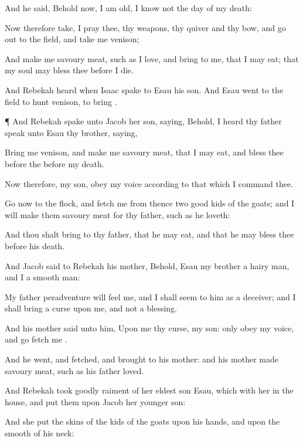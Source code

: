 {And he
said, Behold now, I am
old, I
know not the
day of my
death:

Now therefore
take, I pray thee, thy
weapons, thy
quiver and thy
bow, and go
out to the
field, and
take me
{}
venison;

And
make me savoury
meat, such
as I
love, and
bring
{} to me, that I may
eat; that my
soul may
bless thee
before I
die.

And
Rebekah
heard when
Isaac
spake to
Esau his
son. And
Esau
went to the
field to
hunt
{}
venison,
{} to
bring
{}.


\par }{\PP {}¶ And
Rebekah
spake unto
Jacob her
son,
saying, Behold, I
heard thy
father
speak unto
Esau thy
brother,
saying,

Bring me
venison, and
make me savoury
meat, that I may
eat, and
bless thee
before the
{}
before my
death.

Now therefore, my
son,
obey my
voice according to that
which I
command thee.

Go now to the
flock, and
fetch me from thence
two
good
kids of the
goats; and I will
make them savoury
meat for thy
father, such as he
loveth:

And thou shalt
bring
{} to thy
father, that he may
eat, and
that he may
bless thee
before his
death.

And
Jacob
said to
Rebekah his
mother, Behold,
Esau my
brother
{} a
hairy
man, and I
{} a
smooth
man:

My
father peradventure will
feel me, and I shall
seem to him as a
deceiver; and I shall
bring a
curse upon me, and not a
blessing.

And his
mother
said unto him, Upon me
{} thy
curse, my
son: only
obey my
voice, and
go
fetch me
{}.

And he
went, and
fetched, and
brought
{} to his
mother: and his
mother
made savoury
meat, such as his
father
loved.

And
Rebekah
took
goodly
raiment of her
eldest
son
Esau, which
{} with her in the
house, and put them
upon
Jacob her
younger
son:

And she
put the
skins of the
kids of the
goats upon his
hands, and upon the
smooth of his
neck:

}
